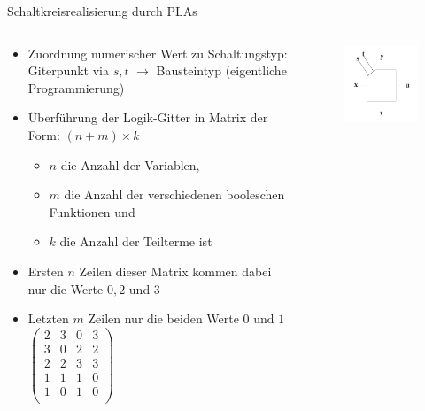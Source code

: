 \documentclass[12pt%
,xcolor=table
,aspectratio=169%
]{beamer}
\begin{document}
\begin{frame}{Schaltkreisrealisierung durch PLAs}
\begin{columns}[T] %
\begin{column}{.82\textwidth}
\begin{itemize}
	\item Zuordnung numerischer Wert zu Schaltungstyp: Giterpunkt via $s,t$ $\to$ Bausteintyp (eigentliche Programmierung)
	\item Überführung der Logik-Gitter in Matrix der Form: $(n + m) \times k$
	\begin{itemize}
		\item $n$ die Anzahl der Variablen,
		\item $m$ die Anzahl der verschiedenen booleschen Funktionen und
		\item $k$ die Anzahl der Teilterme ist
	\end{itemize}
	\item Ersten $n$ Zeilen dieser Matrix kommen dabei nur die Werte $0, 2$ und $3$
	\item Letzten $m$ Zeilen nur die beiden Werte $0$ und $1$
	$\begin{pmatrix}
	2 & 3 & 0 & 3 \\
	3 & 0 & 2 & 2 \\
	2 & 2 & 3 & 3 \\ \hline
	1 & 1 & 1 & 0 \\ 
	1 & 0 & 1 & 0 \\
	\end{pmatrix}$
\end{itemize}
\end{column}%
\hfill%
\begin{column}{.3\textwidth}
\centering
\hspace*{-2.7cm}
\begin{figure}
\includegraphics[scale=0.275]{pictures/pla1}\\

\end{figure}
\end{column}
\end{columns}
\end{frame}
\end{document}
